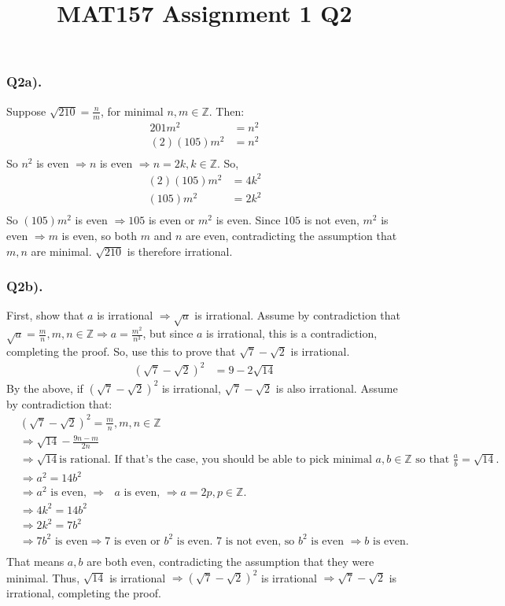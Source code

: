 \documentclass{article}
\title{MAT157 Assignment 1 Q2}
\begin{document}
\subsubsection*{Q2a).}
Suppose $\sqrt{210}= \frac{n}{m}$, for minimal $n, m \in \mathbb{Z}$. Then:
\begin{align*}
201m^{2} &= n^{2}\\
(2)(105)m^{2} &= n^{2}\\
\end{align*}
So $n^{2}$ is even $\Rightarrow n$ is even $\Rightarrow n=2k, k \in \mathbb{Z}$. So,
\begin{align*}
(2)(105)m^{2} &= 4k^{2}\\
(105)m^{2} &= 2k^{2}\\
\end{align*}
So $(105)m^{2}$ is even $\Rightarrow 105$ is even or $m^{2}$ is even. Since $105$ is not even, $m^2$ is even $\Rightarrow m$ is even, so both $m$ and $n$ are even, contradicting the assumption that $m, n$ are minimal. $\sqrt{210}$ is therefore irrational.  
\subsubsection*{Q2b).}
First, show that $a$ is irrational $\Rightarrow \sqrt{a}$ is irrational. Assume by contradiction that $\sqrt{a} = \frac{m}{n}, m, n \in \mathbb{Z} \Rightarrow a = \frac{m^{2}}{n^{3}}$, but since $a$ is irrational, this is a contradiction, completing the proof. So, use this to prove that $\sqrt{7} - \sqrt{2}$ is irrational. 
\begin{align*}
(\sqrt{7} - \sqrt{2})^{2} &= 9 - 2\sqrt{14} 
\end{align*}
By the above, if $(\sqrt{7} - \sqrt{2})^{2}$ is irrational, $\sqrt{7} - \sqrt{2}$ is also irrational. Assume by contradiction that: \\
\begin{align*}
&(\sqrt{7} - \sqrt{2})^{2} = \frac{m}{n},  m, n \in \mathbb{Z}\\
&\Rightarrow \sqrt{14} - \frac{9n - m}{2n}\\
&\Rightarrow \sqrt{14} \text{is rational. If that's the case, you should be able to pick minimal $a, b \in \mathbb{Z}$ so that $\frac{a}{b} = \sqrt{14}$.}\\
&\Rightarrow a^{2} = 14b^{2}\\
&\Rightarrow \text{$a^{2}$ is even, $\Rightarrow$ $a$ is even, $\Rightarrow a=2p, p \in \mathbb{Z}$.}\\
&\Rightarrow 4k^{2} = 14b^{2}\\
&\Rightarrow 2k^{2} = 7b^{2}\\
&\Rightarrow \text{$7b^{2}$ is even$\Rightarrow 7$ is even or $b^{2}$ is even. $7$ is not even, so $b^{2}$ is even $\Rightarrow b$ is even.}\\
\end{align*}
That means $a, b$ are both even, contradicting the assumption that they were minimal. Thus, $\sqrt{14}$ is irrational $\Rightarrow (\sqrt{7} - \sqrt{2})^{2}$ is irrational $\Rightarrow \sqrt{7} - \sqrt{2}$ is irrational, completing the proof.
\end{document}
